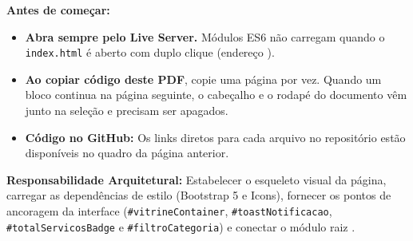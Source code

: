\begin{tcolorbox}[
    colback=azulTitulo!5, colframe=azulTitulo!80,
    boxrule=0.8pt, arc=4pt, left=8pt, right=8pt, top=6pt, bottom=6pt
]
\textbf{\color{azulTitulo}Antes de começar:}
\begin{itemize}[leftmargin=*, nosep]
  \item \textbf{Abra sempre pelo Live Server.} Módulos ES6 não carregam quando o \texttt{index.html} é aberto com duplo clique (endereço ).
  \item \textbf{Ao copiar código deste PDF}, copie uma página por vez. Quando um bloco continua na página seguinte, o cabeçalho e o rodapé do documento vêm junto na seleção e precisam ser apagados.
  \item \textbf{Código no GitHub:} Os links diretos para cada arquivo no repositório estão disponíveis no quadro da página anterior.
\end{itemize}
\end{tcolorbox}

\begin{boxAtividade}
\textbf{Responsabilidade Arquitetural:} Estabelecer o esqueleto visual da página, carregar as dependências de estilo (Bootstrap 5 e Icons), fornecer os pontos de ancoragem da interface (\texttt{\#vitrineContainer}, \texttt{\#toastNotificacao}, \texttt{\#totalServicosBadge} e \texttt{\#filtroCategoria}) e conectar o módulo raiz .
\end{boxAtividade}

